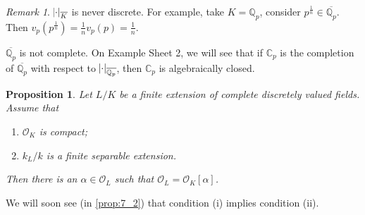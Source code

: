 \documentclass[11pt]{article}
\theoremstyle{definition}
\theoremstyle{plain}
\newtheorem{proposition}[definition]{Proposition}
\theoremstyle{remark}
\newtheorem*{remark}{Remark}
\newcommand{\QQ}{\mathbb{Q}}
\newcommand{\CC}{\mathbb{C}}
\newcommand{\cO}{\mathcal{O}}
\begin{document}
\begin{remark}
    $\abs{\cdot}_{\overline{K}}$ is never discrete. For example, take $K = \QQ_p$, consider $p^\frac{1}{n} \in \overline{\QQ_p}$. Then $v_p(p^\frac{1}{n}) = \frac{1}{n} v_p(p) = \frac{1}{n}$.

    $\overline{\QQ_p}$ is not complete. On Example Sheet 2, we will see that if $\CC_p$ is the completion of $\overline{\QQ_p}$ with respect to $\abs{\cdot}_{\overline{\QQ_p}}$, then $\CC_p$ is algebraically closed.
\end{remark}

\begin{proposition}\label{prop:6_12}
    Let $L/K$ be a finite extension of complete discretely valued fields. Assume that
    \begin{enumerate}
        \item $\cO_K$ is compact;
        \item $k_L / k$ is a finite separable extension.
    \end{enumerate}
Then there is an $\alpha \in \cO_L$ such that $\cO_L = \cO_K[\alpha]$.
\end{proposition}

\noindent We will soon see (in \autoref{prop:7_2}) that condition (i) implies condition (ii).
\end{document}
